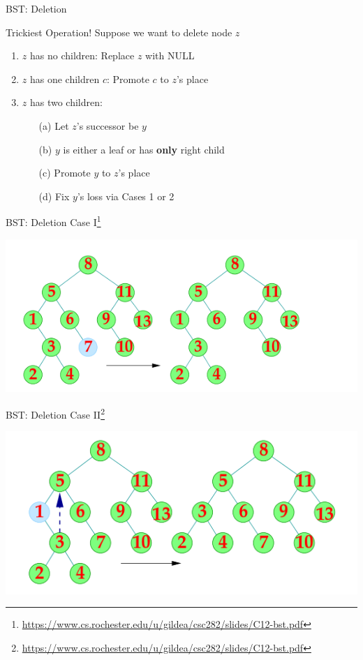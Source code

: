 \documentclass{beamer}
\newcommand{\furl}[1]{{\footnote{\url{#1}}}}
\begin{document}
\begin{frame}{BST: Deletion}

    Trickiest Operation! Suppose we want to delete node $z$
    \begin{enumerate}
        \item $z$ has no children: Replace $z$ with NULL
        \item $z$ has one children $c$: Promote $c$ to $z$'s place
        \item $z$ has two children: 
        \begin{enumerate}
            \item[(a)] Let $z$'s successor be $y$
            \item[(b)] $y$ is either a leaf or has {\bf only} right child
            \item[(c)] Promote $y$ to $z$'s place
            \item[(d)] Fix $y$'s loss via Cases 1 or 2
        \end{enumerate}
    \end{enumerate}
\end{frame}


\begin{frame}{BST: Deletion Case I\furl{https://www.cs.rochester.edu/u/gildea/csc282/slides/C12-bst.pdf}}
    \begin{center}
        \includegraphics[scale=0.6]{bstDelCase1.png}
    \end{center}
\end{frame}


\begin{frame}{BST: Deletion Case II\furl{https://www.cs.rochester.edu/u/gildea/csc282/slides/C12-bst.pdf}}
    \begin{center}
        \includegraphics[scale=0.6]{bstDelCase2.png}
    \end{center}
\end{frame}
\end{document}
